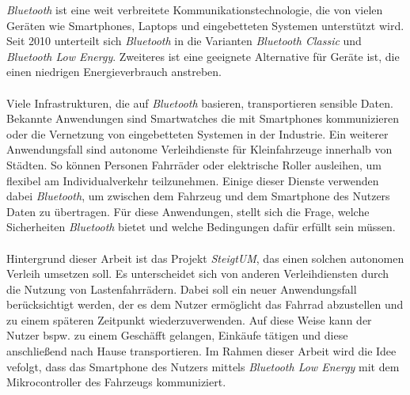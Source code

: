 \textit{Bluetooth} ist eine weit verbreitete Kommunikationstechnologie, die von vielen Geräten wie Smartphones, Laptops und eingebetteten Systemen unterstützt wird. Seit 2010 unterteilt sich \textit{Bluetooth} in die Varianten \textit{Bluetooth Classic} und \textit{Bluetooth Low Energy}. Zweiteres ist eine geeignete Alternative für Geräte ist, die einen niedrigen Energieverbrauch anstreben.
\\\\
Viele Infrastrukturen, die auf \textit{Bluetooth} basieren, transportieren sensible Daten. Bekannte Anwendungen sind Smartwatches die mit Smartphones kommunizieren oder die Vernetzung von eingebetteten Systemen in der Industrie. Ein weiterer Anwendungsfall sind autonome Verleihdienste für Kleinfahrzeuge innerhalb von Städten. So können Personen Fahrräder oder elektrische Roller ausleihen, um flexibel am Individualverkehr teilzunehmen. Einige dieser Dienste verwenden dabei \textit{Bluetooth}, um zwischen dem Fahrzeug und dem Smartphone des Nutzers Daten zu übertragen. Für diese Anwendungen, stellt sich die Frage, welche Sicherheiten \textit{Bluetooth} bietet und welche Bedingungen dafür erfüllt sein müssen. 
\\\\
Hintergrund dieser Arbeit ist das Projekt \textit{SteigtUM}, das einen solchen autonomen Verleih umsetzen soll. Es unterscheidet sich von anderen Verleihdiensten durch die Nutzung von Lastenfahrrädern. Dabei soll ein neuer Anwendungsfall berücksichtigt werden, der es dem Nutzer ermöglicht das Fahrrad abzustellen und zu einem späteren Zeitpunkt wiederzuverwenden. Auf diese Weise kann der Nutzer bspw. zu einem Geschäfft gelangen, Einkäufe tätigen und diese anschließend nach Hause transportieren. Im Rahmen dieser Arbeit wird die Idee vefolgt, dass das Smartphone des Nutzers mittels \textit{Bluetooth Low Energy} mit dem Mikrocontroller des Fahrzeugs kommuniziert.
